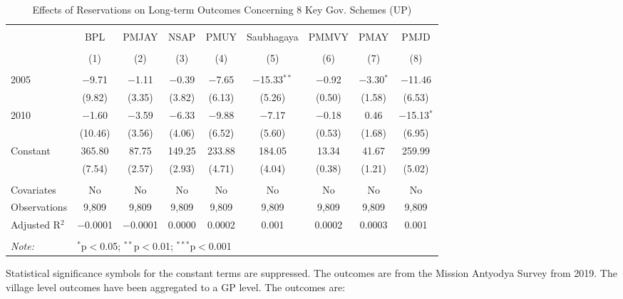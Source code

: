 \begin{table}[!htbp]
\centering
\begin{threeparttable}

  \caption{Effects of Reservations on Long-term Outcomes Concerning 8 Key Gov. Schemes (UP)} 
  \label{up_shrug_schemes_05_10} 
\scriptsize 
\begin{tabular}{@{\extracolsep{0pt}}lcccccccc} 
\\[-1.8ex]\hline 
\hline \\[-1.8ex] 
 & BPL & PMJAY & NSAP & PMUY & Saubhagaya & PMMVY & PMAY & PMJD \\ 
\\[-1.8ex] & (1) & (2) & (3) & (4) & (5) & (6) & (7) & (8)\\ 
\hline \\[-1.8ex] 
 2005 & $-$9.71 & $-$1.11 & $-$0.39 & $-$7.65 & $-$15.33$^{**}$ & $-$0.92 & $-$3.30$^{*}$ & $-$11.46 \\ 
  & (9.82) & (3.35) & (3.82) & (6.13) & (5.26) & (0.50) & (1.58) & (6.53) \\ 
  2010 & $-$1.60 & $-$3.59 & $-$6.33 & $-$9.88 & $-$7.17 & $-$0.18 & 0.46 & $-$15.13$^{*}$ \\ 
  & (10.46) & (3.56) & (4.06) & (6.52) & (5.60) & (0.53) & (1.68) & (6.95) \\ 
  Constant & 365.80 & 87.75 & 149.25 & 233.88 & 184.05 & 13.34 & 41.67 & 259.99 \\ 
  & (7.54) & (2.57) & (2.93) & (4.71) & (4.04) & (0.38) & (1.21) & (5.02) \\ 
 \hline \\[-1.8ex] 
Covariates & No & No & No & No & No & No & No & No \\ 
Observations & 9,809 & 9,809 & 9,809 & 9,809 & 9,809 & 9,809 & 9,809 & 9,809 \\ 
Adjusted R$^{2}$ & $-$0.0001 & $-$0.0001 & 0.0000 & 0.0002 & 0.001 & 0.0002 & 0.0003 & 0.001 \\ 
\hline 
\hline \\[-1.8ex] 
\textit{Note:}  & \multicolumn{8}{l}{$^{*}$p$<$0.05; $^{**}$p$<$0.01; $^{***}$p$<$0.001} \\ 
\end{tabular} 
\begin{tablenotes}[flushleft]
\scriptsize
\item Statistical significance symbols for the constant terms are suppressed. The outcomes are from the Mission Antyodya Survey from 2019. 
                   The village level outcomes have been aggregated to a GP level. The outcomes are:

\end{tablenotes}
\end{threeparttable}
\end{table}

